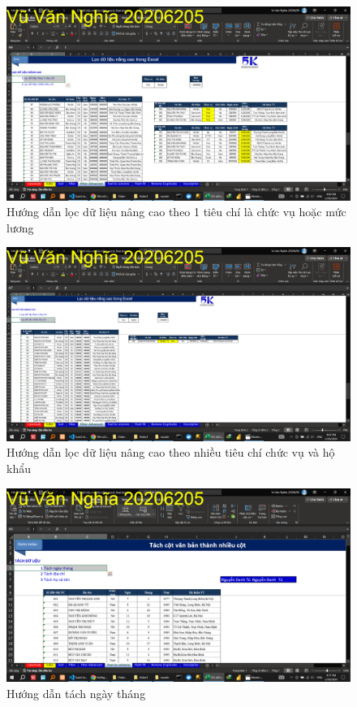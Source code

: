 \documentclass{article}
\begin{document}
\begin{figure}[H]
    \centering
    \includegraphics[scale = 0.15]{Video1/HuongDan/6.png}
    \caption{Hướng dẫn lọc dữ liệu nâng cao theo 1 tiêu chí là chức vụ hoặc mức lương}
\end{figure}




\begin{figure}[H]
    \centering
    \includegraphics[scale = 0.15]{Video1/HuongDan/7.png}
    \caption{Hướng dẫn lọc dữ liệu nâng cao theo nhiều tiêu chí chức vụ và hộ khẩu}
\end{figure}



\begin{figure}[H]
    \centering
    \includegraphics[scale = 0.15]{Video1/HuongDan/8.png}
    \caption{Hướng dẫn tách ngày tháng}
\end{figure}
\end{document}
